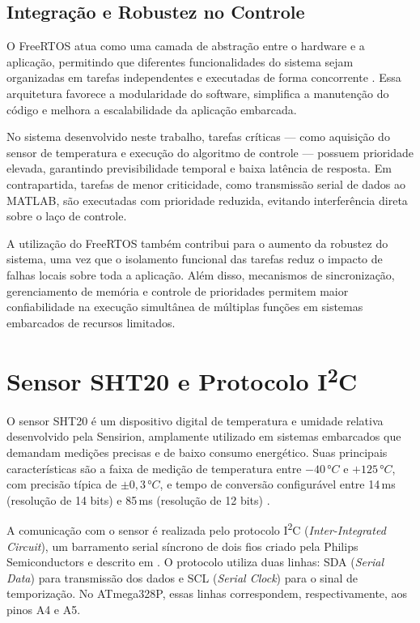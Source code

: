 \documentclass[repeatfields,xlists,xpacks,oneside]{ufrgscca}
\newcommand{\IIC}{I\textsuperscript{2}C}
\begin{document}
\subsection{Integração e Robustez no Controle}

O FreeRTOS atua como uma camada de abstração entre o hardware e a aplicação, permitindo que diferentes funcionalidades do sistema sejam organizadas em tarefas independentes e executadas de forma concorrente \cite{Morais2018}. Essa arquitetura favorece a modularidade do software, simplifica a manutenção do código e melhora a escalabilidade da aplicação embarcada.

No sistema desenvolvido neste trabalho, tarefas críticas --- como aquisição do sensor de temperatura e execução do algoritmo de controle --- possuem prioridade elevada, garantindo previsibilidade temporal e baixa latência de resposta. Em contrapartida, tarefas de menor criticidade, como transmissão serial de dados ao MATLAB, são executadas com prioridade reduzida, evitando interferência direta sobre o laço de controle.

A utilização do FreeRTOS também contribui para o aumento da robustez do sistema, uma vez que o isolamento funcional das tarefas reduz o impacto de falhas locais sobre toda a aplicação. Além disso, mecanismos de sincronização, gerenciamento de memória e controle de prioridades permitem maior confiabilidade na execução simultânea de múltiplas funções em sistemas embarcados de recursos limitados.

\section{Sensor SHT20 e Protocolo \IIC{}}

O sensor SHT20 é um dispositivo digital de temperatura e umidade relativa desenvolvido pela Sensirion, amplamente utilizado em sistemas embarcados que demandam medições precisas e de baixo consumo energético. Suas principais características são a faixa de medição de temperatura entre $-40\,°C$ e $+125\,°C$, com precisão típica de $\pm 0{,}3\,°C$, e tempo de conversão configurável entre 14\,ms (resolução de 14 bits) e 85\,ms (resolução de 12 bits) \cite{sensirion_sht20}.

A comunicação com o sensor é realizada pelo protocolo \IIC{} (\textit{Inter-Integrated Circuit}), um barramento serial síncrono de dois fios criado pela Philips Semiconductors e descrito em \cite{nxp_i2c}. O protocolo utiliza duas linhas: SDA (\textit{Serial Data}) para transmissão dos dados e SCL (\textit{Serial Clock}) para o sinal de temporização. No ATmega328P, essas linhas correspondem, respectivamente, aos pinos A4 e A5.
\end{document}
